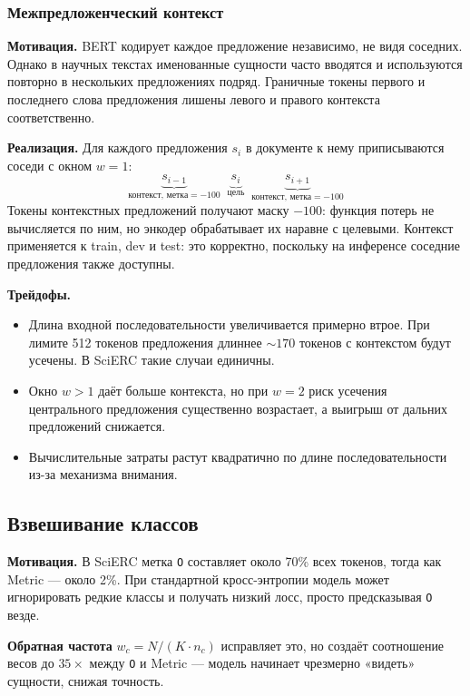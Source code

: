 \subsubsection{Межпредложенческий контекст}

\textbf{Мотивация.} BERT кодирует каждое предложение независимо, не видя соседних. Однако в научных текстах именованные сущности часто вводятся и используются повторно в нескольких предложениях подряд. Граничные токены первого и последнего слова предложения лишены левого и правого контекста соответственно.

\textbf{Реализация.} Для каждого предложения $s_i$ в документе к нему приписываются соседи с окном $w = 1$:
\[
    \underbrace{s_{i-1}}_{\text{контекст, метка} = -100} \;\; \underbrace{s_i}_{\text{цель}} \;\; \underbrace{s_{i+1}}_{\text{контекст, метка} = -100}
\]
Токены контекстных предложений получают маску $-100$: функция потерь не вычисляется по ним, но энкодер обрабатывает их наравне с целевыми. Контекст применяется к train, dev и test: это корректно, поскольку на инференсе соседние предложения также доступны.

\textbf{Трейдофы.}
\begin{itemize}
    \item Длина входной последовательности увеличивается примерно втрое. При лимите 512 токенов предложения длиннее $\sim 170$ токенов с контекстом будут усечены. В SciERC такие случаи единичны.
    \item Окно $w > 1$ даёт больше контекста, но при $w = 2$ риск усечения центрального предложения существенно возрастает, а выигрыш от дальних предложений снижается.
    \item Вычислительные затраты растут квадратично по длине последовательности из-за механизма внимания.
\end{itemize}

\subsection{Взвешивание классов}

\textbf{Мотивация.} В SciERC метка \texttt{O} составляет около 70\% всех токенов, тогда как Metric --- около 2\%. При стандартной кросс-энтропии модель может игнорировать редкие классы и получать низкий лосс, просто предсказывая \texttt{O} везде.

\textbf{Обратная частота} $w_c = N / (K \cdot n_c)$ исправляет это, но создаёт соотношение весов до $35 \times$ между \texttt{O} и Metric --- модель начинает чрезмерно «видеть» сущности, снижая точность.

